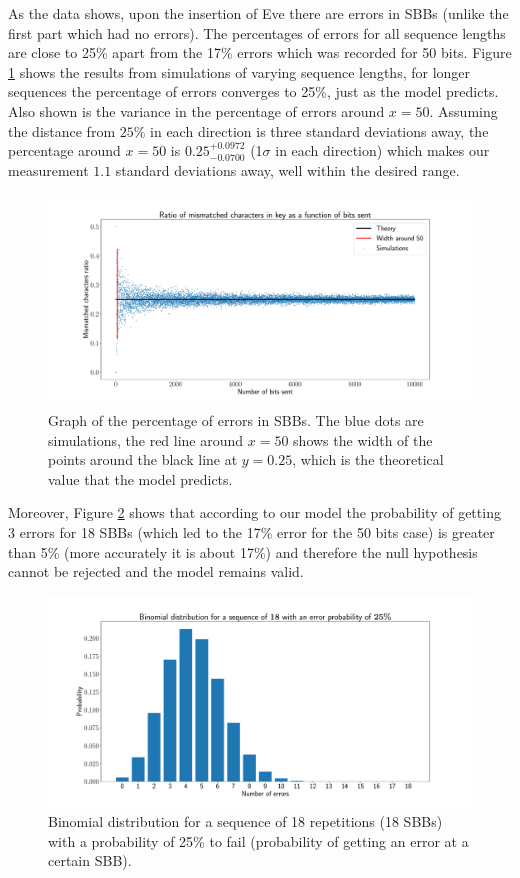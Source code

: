 \documentclass[reprint,amsmath,amssymb,aps, prl,superscriptaddress]{revtex4-2}
\begin{document}
As the data shows, upon the insertion of Eve there are errors in SBBs (unlike the first part which had no errors). The percentages of errors for all sequence lengths are close to 25\% apart from the 17\% errors which was recorded for 50 bits. Figure \ref{fig: Simulation of the error as function of sequence length} shows the results from simulations of varying sequence lengths, for longer sequences the percentage of errors converges to 25\%, just as the model predicts. Also shown is the variance  in the percentage of errors around $x=50$. Assuming the distance from $25\%$ in each direction is three standard deviations away, the percentage around $x=50$ is $0.25_{-0.0700}^{+0.0972}$ (1$\sigma$ in each direction) which makes our measurement $1.1$ standard deviations away, well within the desired range.
\begin{figure}[H]
	\includegraphics[width=\linewidth]{Images/PercentSimulation}

	\caption{Graph of the percentage of errors in SBBs. The blue dots are simulations, the red line around $x=50$ shows the width of the points around the black line at $y=0.25$, which is the theoretical value that the model predicts. \label{fig: Simulation of the error as function of sequence length}}
\end{figure}
Moreover, Figure \ref{fig: Binomial Distribution} shows that according to our model the probability of getting 3 errors for 18 SBBs (which led to the 17\% error for the 50 bits case) is greater than 5\% (more accurately it is about 17\%) and therefore the null hypothesis cannot be rejected and the model remains valid.
\begin{figure}[H]
\includegraphics[width=\linewidth]{Images/BinomialDist18}

\caption{Binomial distribution for a sequence of 18 repetitions (18 SBBs) with a probability of 25\% to fail (probability of getting an error at a certain SBB). \label{fig: Binomial Distribution}}

\end{figure}
\end{document}
